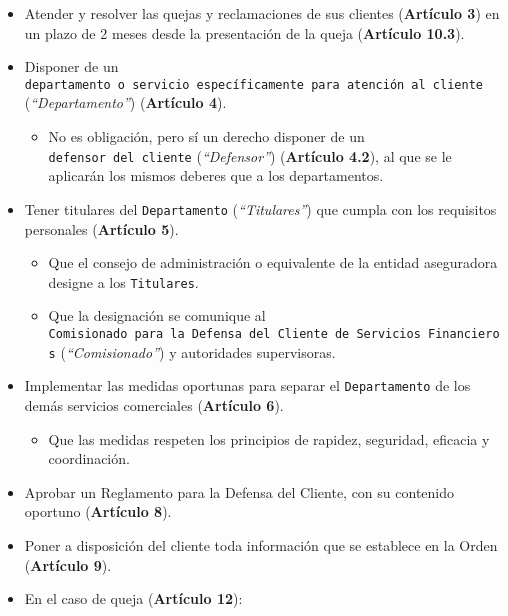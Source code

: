 \documentclass[
]{article}
\providecommand{\tightlist}{%
  \setlength{\itemsep}{0pt}\setlength{\parskip}{0pt}}
\begin{document}
\begin{itemize}
\tightlist
\item
  Atender y resolver las quejas y reclamaciones de sus clientes
  (\textbf{Artículo 3}) en un plazo de 2 meses desde la presentación de
  la queja (\textbf{Artículo 10.3}).
\item
  Disponer de un
  \texttt{departamento\ o\ servicio\ específicamente\ para\ atención\ al\ cliente}
  (\emph{``Departamento''}) (\textbf{Artículo 4}).

  \begin{itemize}
  \tightlist
  \item
    No es obligación, pero sí un derecho disponer de un
    \texttt{defensor\ del\ cliente} (\emph{``Defensor''})
    (\textbf{Artículo 4.2}), al que se le aplicarán los mismos deberes
    que a los departamentos.
  \end{itemize}
\item
  Tener titulares del \texttt{Departamento} (\emph{``Titulares''}) que
  cumpla con los requisitos personales (\textbf{Artículo 5}).

  \begin{itemize}
  \tightlist
  \item
    Que el consejo de administración o equivalente de la entidad
    aseguradora designe a los \texttt{Titulares}.
  \item
    Que la designación se comunique al
    \texttt{Comisionado\ para\ la\ Defensa\ del\ Cliente\ de\ Servicios\ Financieros}
    (\emph{``Comisionado''}) y autoridades supervisoras.
  \end{itemize}
\item
  Implementar las medidas oportunas para separar el
  \texttt{Departamento} de los demás servicios comerciales
  (\textbf{Artículo 6}).

  \begin{itemize}
  \tightlist
  \item
    Que las medidas respeten los principios de rapidez, seguridad,
    eficacia y coordinación.
  \end{itemize}
\item
  Aprobar un Reglamento para la Defensa del Cliente, con su contenido
  oportuno (\textbf{Artículo 8}).
\item
  Poner a disposición del cliente toda información que se establece en
  la Orden (\textbf{Artículo 9}).
\item
  En el caso de queja (\textbf{Artículo 12}):


\end{itemize}
\end{document}
